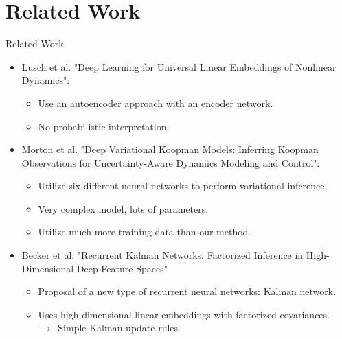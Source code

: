 \documentclass[
	aspectratio=43,
	color={accentcolor=1c},
	logo=false,
	colorframetitle=true,
	handout
]{tudabeamer}
\begin{document}
	\section{Related Work}
		\begin{frame}{Related Work}
			\begin{itemize}
				\item<+-> Lusch et al. "Deep Learning for Universal Linear Embeddings of Nonlinear Dynamics":
					\begin{itemize}
						\item Use an autoencoder approach with an encoder network.
						\item No probabilistic interpretation.
				\end{itemize}
				\item<+-> Morton et al. "Deep Variational Koopman Models: Inferring Koopman Observations for Uncertainty-Aware Dynamics Modeling and Control":
					\begin{itemize}
						\item Utilize six different neural networks to perform variational inference.
						\item Very complex model, lots of parameters.
						\item Utilize much more training data than our method.
					\end{itemize}
				\item<+-> Becker et al. "Recurrent Kalman Networks: Factorized Inference in High-Dimensional Deep Feature Spaces"
					\begin{itemize}
						\item Proposal of a new type of recurrent neural networks: Kalman network.
						\item Uses high-dimensional linear embeddings with factorized covariances. \\
							\quad \(\longrightarrow\,\) Simple Kalman update rules.
					\end{itemize}
			\end{itemize}
		\end{frame}
\end{document}
